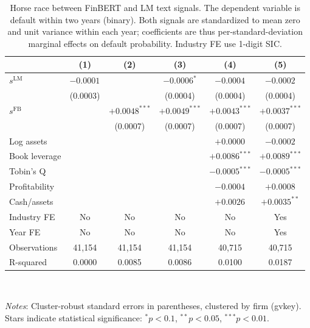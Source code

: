 \begin{table}[htbp]
\centering
\caption{Horse race between FinBERT and LM text signals. The dependent variable is default within two years (binary). Both signals are standardized to mean zero and unit variance within each year; coefficients are thus per-standard-deviation marginal effects on default probability. Industry FE use 1-digit SIC.}
\label{tab:t6_horse_race}
\small
\begin{tabular}{lccccc}
\toprule
 & (1) & (2) & (3) & (4) & (5) \\
\midrule
$s^{\mathrm{LM}}$ & $-0.0001^{}$ &  & $-0.0006^{*}$ & $-0.0004^{}$ & $-0.0002^{}$ \\
 & (0.0003) &  & (0.0004) & (0.0004) & (0.0004) \\
$s^{\mathrm{FB}}$ &  & $+0.0048^{***}$ & $+0.0049^{***}$ & $+0.0043^{***}$ & $+0.0037^{***}$ \\
 &  & (0.0007) & (0.0007) & (0.0007) & (0.0007) \\
\midrule
Log assets &  &  &  & $+0.0000^{}$ & $-0.0002^{}$ \\
Book leverage &  &  &  & $+0.0086^{***}$ & $+0.0089^{***}$ \\
Tobin's Q &  &  &  & $-0.0005^{***}$ & $-0.0005^{***}$ \\
Profitability &  &  &  & $-0.0004^{}$ & $+0.0008^{}$ \\
Cash/assets &  &  &  & $+0.0026^{}$ & $+0.0035^{**}$ \\
\midrule
Industry FE & No & No & No & No & Yes \\
Year FE & No & No & No & No & Yes \\
\midrule
Observations & 41,154 & 41,154 & 41,154 & 40,715 & 40,715 \\
R-squared & 0.0000 & 0.0085 & 0.0086 & 0.0100 & 0.0187 \\
\bottomrule
\end{tabular}
\\[-2ex]
\begin{flushleft}
\footnotesize
\textit{Notes}: Cluster-robust standard errors in parentheses, clustered by firm (gvkey). Stars indicate statistical significance: $^{*}p<0.1$, $^{**}p<0.05$, $^{***}p<0.01$.
\end{flushleft}
\end{table}